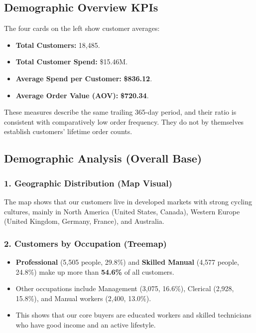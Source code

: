 \subsection{Demographic Overview KPIs}
\label{subsec:bi_page2_kpis}
The four cards on the left show customer averages:
\begin{itemize}
    \item \textbf{Total Customers:} 18,485.
    \item \textbf{Total Customer Spend:} \$15.46M.
    \item \textbf{Average Spend per Customer:} \textbf{\$836.12}.
    \item \textbf{Average Order Value (AOV):} \textbf{\$720.34}.
\end{itemize}
These measures describe the same trailing 365-day period, and their ratio is consistent with comparatively low order frequency. They do not by themselves establish customers' lifetime order counts.

\subsection{Demographic Analysis (Overall Base)}
\label{subsec:bi_page2_insights}
\subsubsection{1. Geographic Distribution (Map Visual)}
The map shows that our customers live in developed markets with strong cycling cultures, mainly in North America (United States, Canada), Western Europe (United Kingdom, Germany, France), and Australia.

\subsubsection{2. Customers by Occupation (Treemap)}
\begin{itemize}
    \item \textbf{Professional} (5,505 people, 29.8\%) and \textbf{Skilled Manual} (4,577 people, 24.8\%) make up more than \textbf{54.6\%} of all customers.
    \item Other occupations include Management (3,075, 16.6\%), Clerical (2,928, 15.8\%), and Manual workers (2,400, 13.0\%).
    \item This shows that our core buyers are educated workers and skilled technicians who have good income and an active lifestyle.
\end{itemize}

